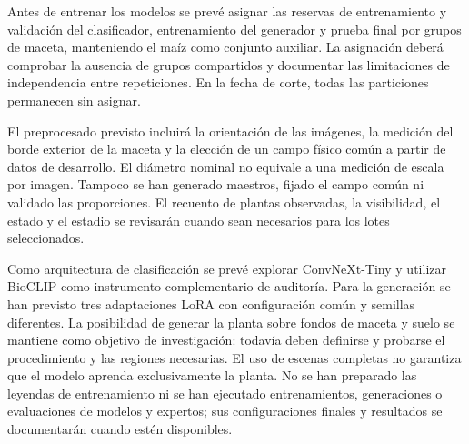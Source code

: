 Antes de entrenar los modelos se prevé asignar las reservas de entrenamiento y validación del clasificador, entrenamiento del generador y prueba final por grupos de maceta, manteniendo el maíz como conjunto auxiliar. La asignación deberá comprobar la ausencia de grupos compartidos y documentar las limitaciones de independencia entre repeticiones. En la fecha de corte, todas las particiones permanecen sin asignar.

El preprocesado previsto incluirá la orientación de las imágenes, la medición del borde exterior de la maceta y la elección de un campo físico común a partir de datos de desarrollo. El diámetro nominal no equivale a una medición de escala por imagen. Tampoco se han generado maestros, fijado el campo común ni validado las proporciones. El recuento de plantas observadas, la visibilidad, el estado y el estadio se revisarán cuando sean necesarios para los lotes seleccionados.

Como arquitectura de clasificación se prevé explorar ConvNeXt-Tiny y utilizar BioCLIP como instrumento complementario de auditoría. Para la generación se han previsto tres adaptaciones LoRA con configuración común y semillas diferentes. La posibilidad de generar la planta sobre fondos de maceta y suelo se mantiene como objetivo de investigación: todavía deben definirse y probarse el procedimiento y las regiones necesarias. El uso de escenas completas no garantiza que el modelo aprenda exclusivamente la planta. No se han preparado las leyendas de entrenamiento ni se han ejecutado entrenamientos, generaciones o evaluaciones de modelos y expertos; sus configuraciones finales y resultados se documentarán cuando estén disponibles.
